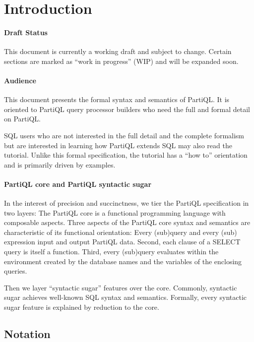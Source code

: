 \section{Introduction}
\label{sec:introduction}

\paragraph{Draft Status} This document is currently a working draft and subject
to change.  Certain sections are marked as ``work in progress'' (WIP) and will
be expanded soon.

\paragraph{Audience} This document presents the formal syntax and semantics of
PartiQL. It is oriented to PartiQL query processor builders who need the full
and formal detail on PartiQL.

SQL users who are not interested in the full detail and the complete formalism
but are interested in learning how PartiQL extends SQL may also read the
tutorial. Unlike this formal specification, the tutorial has a ``how to''
orientation and is primarily driven by examples.

\paragraph{PartiQL core and PartiQL syntactic sugar}
In the interest of precision and succinctness, we tier the PartiQL specification
in two layers: The PartiQL core is a functional programming language with
composable aspects. Three aspects of the PartiQL core syntax and semantics are
characteristic of its functional orientation: Every (sub)query and every (sub)
expression input and output PartiQL data. Second, each clause of a SELECT query
is itself a function. Third, every (sub)query evaluates within the environment
created by the database names and the variables of the enclosing queries.

Then we layer ``syntactic sugar'' features over the core. Commonly, syntactic
sugar achieves well-known SQL syntax and semantics. Formally, every syntactic
sugar feature is explained by reduction to the core.

\subsection{Notation}
\label{sec:notation}


